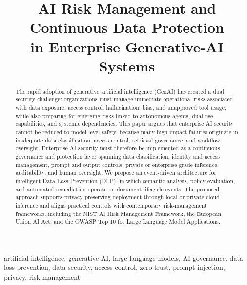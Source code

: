 \documentclass[conference]{IEEEtran}
\begin{document}
\title{AI Risk Management and Continuous Data Protection\\
in Enterprise Generative-AI Systems}

\author{
}

\maketitle

\begin{abstract}
The rapid adoption of generative artificial intelligence (GenAI) has created a dual security challenge: organizations must manage immediate operational risks associated with data exposure, access control, hallucination, bias, and unapproved tool usage, while also preparing for emerging risks linked to autonomous agents, dual-use capabilities, and systemic dependencies. This paper argues that enterprise AI security cannot be reduced to model-level safety, because many high-impact failures originate in inadequate data classification, access control, retrieval governance, and workflow oversight. Enterprise AI security must therefore be implemented as a continuous governance and protection layer spanning data classification, identity and access management, prompt and output controls, private or enterprise-grade inference, auditability, and human oversight. We propose an event-driven architecture for intelligent Data Loss Prevention (DLP), in which semantic analysis, policy evaluation, and automated remediation operate on document lifecycle events. The proposed approach supports privacy-preserving deployment through local or private-cloud inference and aligns practical controls with contemporary risk-management frameworks, including the NIST AI Risk Management Framework, the European Union AI Act, and the OWASP Top 10 for Large Language Model Applications.
\end{abstract}

\begin{IEEEkeywords}
artificial intelligence, generative AI, large language models, AI governance, data loss prevention, data security, access control, zero trust, prompt injection, privacy, risk management
\end{IEEEkeywords}
\end{document}
